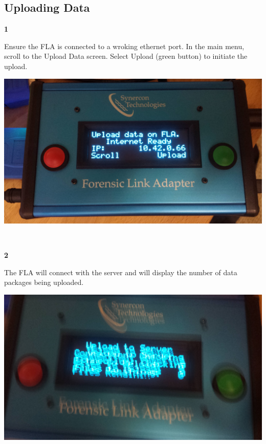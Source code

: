 \documentclass[11pt]{article}
\begin{document}
\subsection{Uploading Data}
\label{subsec:upload_data}
\noindent\begin{minipage}{0.3\textwidth}%
\begin{center}
\textbf{1}\\[\baselineskip]
\end{center}
Ensure the FLA is connected to a wroking ethernet port. In the main menu, scroll to the Upload Data screen. Select Upload (green button) to initiate the upload.
\end{minipage}%
\hfill%
\begin{minipage}{0.6\textwidth}
\includegraphics[width=\linewidth]{./fla_screens/upload_ready}
\end{minipage}
\\[\baselineskip]
\noindent\begin{minipage}{0.3\textwidth}%
\begin{center}
\textbf{2}\\[\baselineskip]
\end{center}
The FLA will connect with the server and will display the number of data packages being uploaded.
\end{minipage}%
\hfill%
\begin{minipage}{0.6\textwidth}
\includegraphics[width=\linewidth]{./fla_screens/upload_checking}
\end{minipage}
\end{document}
